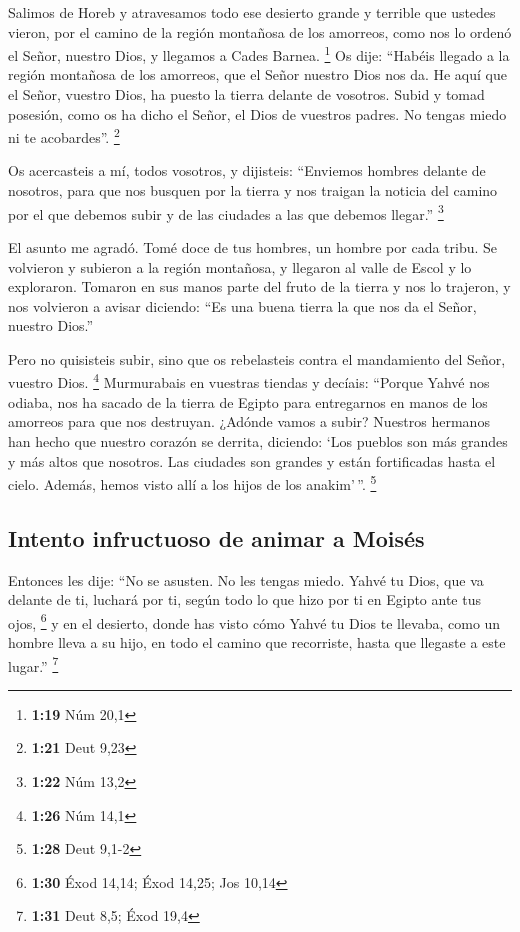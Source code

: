 \begin{paracol}{2}
 Salimos de Horeb y atravesamos todo ese desierto grande
y terrible que ustedes vieron, por el camino de la región montañosa de
los amorreos, como nos lo ordenó el Señor, nuestro Dios, y llegamos a
Cades Barnea. \footnote{\textbf{1:19} Núm 20,1}  Os dije:
``Habéis llegado a la región montañosa de los amorreos, que el Señor
nuestro Dios nos da.  He aquí que el Señor, vuestro Dios,
ha puesto la tierra delante de vosotros. Subid y tomad posesión, como os
ha dicho el Señor, el Dios de vuestros padres. No tengas miedo ni te
acobardes''. \footnote{\textbf{1:21} Deut 9,23}

 Os acercasteis a mí, todos vosotros, y dijisteis:
``Enviemos hombres delante de nosotros, para que nos busquen por la
tierra y nos traigan la noticia del camino por el que debemos subir y de
las ciudades a las que debemos llegar.'' \footnote{\textbf{1:22} Núm
  13,2}

 El asunto me agradó. Tomé doce de tus hombres, un hombre
por cada tribu.  Se volvieron y subieron a la región
montañosa, y llegaron al valle de Escol y lo exploraron. 
Tomaron en sus manos parte del fruto de la tierra y nos lo trajeron, y
nos volvieron a avisar diciendo: ``Es una buena tierra la que nos da el
Señor, nuestro Dios.''

 Pero no quisisteis subir, sino que os rebelasteis contra
el mandamiento del Señor, vuestro Dios. \footnote{\textbf{1:26} Núm 14,1}
 Murmurabais en vuestras tiendas y decíais: ``Porque
Yahvé nos odiaba, nos ha sacado de la tierra de Egipto para entregarnos
en manos de los amorreos para que nos destruyan.  ¿Adónde
vamos a subir? Nuestros hermanos han hecho que nuestro corazón se
derrita, diciendo: `Los pueblos son más grandes y más altos que
nosotros. Las ciudades son grandes y están fortificadas hasta el cielo.
Además, hemos visto allí a los hijos de los anakim'\,''. \footnote{\textbf{1:28}
  Deut 9,1-2}

\hypertarget{intento-infructuoso-de-animar-a-moisuxe9s}{%
\subsection{Intento infructuoso de animar a
Moisés}\label{intento-infructuoso-de-animar-a-moisuxe9s}}

 Entonces les dije: ``No se asusten. No les tengas miedo.
 Yahvé tu Dios, que va delante de ti, luchará por ti,
según todo lo que hizo por ti en Egipto ante tus ojos, \footnote{\textbf{1:30}
  Éxod 14,14; Éxod 14,25; Jos 10,14}  y en el desierto,
donde has visto cómo Yahvé tu Dios te llevaba, como un hombre lleva a su
hijo, en todo el camino que recorriste, hasta que llegaste a este
lugar.'' \footnote{\textbf{1:31} Deut 8,5; Éxod 19,4}


\end{paracol}
